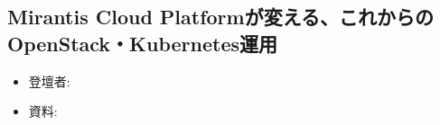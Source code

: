 \begin{center}
  \section*{Mirantis Cloud Platformが変える、これからのOpenStack・Kubernetes運用}
\end{center}


\begin{flushright}
  \begin{itemize}
  \item   登壇者: 
  \item 資料: 
  \end{itemize}
\end{flushright}
